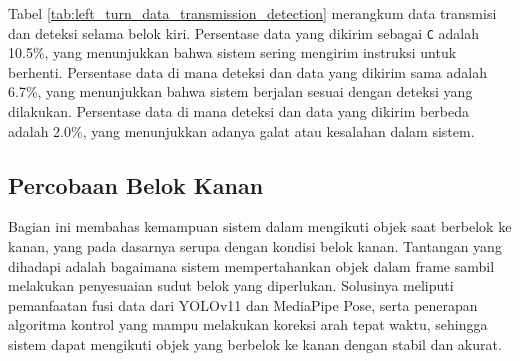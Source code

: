 Tabel \ref{tab:left_turn_data_transmission_detection} merangkum data transmisi dan deteksi selama belok kiri. Persentase data yang dikirim sebagai \texttt{C} adalah 10.5\%, yang menunjukkan bahwa sistem sering mengirim instruksi untuk berhenti. Persentase data di mana deteksi dan data yang dikirim sama adalah 6.7\%, yang menunjukkan bahwa sistem berjalan sesuai dengan deteksi yang dilakukan. Persentase data di mana deteksi dan data yang dikirim berbeda adalah 2.0\%, yang menunjukkan adanya galat atau kesalahan dalam sistem.

\newpage
\subsection{Percobaan Belok Kanan}
\label{subsec:percobaanbelokkanan}

Bagian ini membahas kemampuan sistem dalam mengikuti objek saat berbelok ke kanan, yang pada dasarnya serupa dengan kondisi belok kanan. Tantangan yang dihadapi adalah bagaimana sistem mempertahankan objek dalam frame sambil melakukan penyesuaian sudut belok yang diperlukan. Solusinya meliputi pemanfaatan fusi data dari YOLOv11 dan MediaPipe Pose, serta penerapan algoritma kontrol yang mampu melakukan koreksi arah tepat waktu, sehingga sistem dapat mengikuti objek yang berbelok ke kanan dengan stabil dan akurat.

